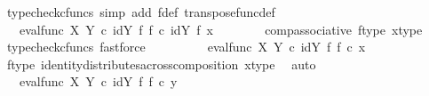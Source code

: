 \begin{isabellebody}
\ {\isacharparenleft}{\kern0pt}typecheck{\isacharunderscore}{\kern0pt}cfuncs{\isacharcomma}{\kern0pt}\ simp\ add{\isacharcolon}{\kern0pt}\ f{\isacharunderscore}{\kern0pt}def\ transpose{\isacharunderscore}{\kern0pt}func{\isacharunderscore}{\kern0pt}def{\isacharparenright}{\kern0pt}\isanewline
\ \ \ \ \isamarkupfalse%
\ \isamarkupfalse%
\ {\isachardoublequoteopen}{\isachardot}{\kern0pt}{\isachardot}{\kern0pt}{\isachardot}{\kern0pt}\ {\isacharequal}{\kern0pt}\ {\isacharparenleft}{\kern0pt}eval{\isacharunderscore}{\kern0pt}func\ X\ Y{\isacharparenright}{\kern0pt}\ {\isasymcirc}\isactrlsub c\ {\isacharparenleft}{\kern0pt}{\isacharparenleft}{\kern0pt}id{\isacharparenleft}{\kern0pt}Y{\isacharparenright}{\kern0pt}\ {\isasymtimes}\isactrlsub f\ f{\isacharparenright}{\kern0pt}\ {\isasymcirc}\isactrlsub c\ {\isacharparenleft}{\kern0pt}id{\isacharparenleft}{\kern0pt}Y{\isacharparenright}{\kern0pt}\ {\isasymtimes}\isactrlsub f\ x{\isacharparenright}{\kern0pt}{\isacharparenright}{\kern0pt}{\isachardoublequoteclose}\isanewline
\ \ \ \ \ \ \isamarkupfalse%
\ comp{\isacharunderscore}{\kern0pt}associative{}\ f{\isacharunderscore}{\kern0pt}type\ x{\isacharunderscore}{\kern0pt}type{}\ \isamarkupfalse%
\ {\isacharparenleft}{\kern0pt}typecheck{\isacharunderscore}{\kern0pt}cfuncs{\isacharcomma}{\kern0pt}\ fastforce{\isacharparenright}{\kern0pt}\isanewline
\ \ \ \ \isamarkupfalse%
\ \isamarkupfalse%
\ {\isachardoublequoteopen}{\isachardot}{\kern0pt}{\isachardot}{\kern0pt}{\isachardot}{\kern0pt}\ {\isacharequal}{\kern0pt}\ {\isacharparenleft}{\kern0pt}eval{\isacharunderscore}{\kern0pt}func\ X\ Y{\isacharparenright}{\kern0pt}\ {\isasymcirc}\isactrlsub c\ {\isacharparenleft}{\kern0pt}id{\isacharparenleft}{\kern0pt}Y{\isacharparenright}{\kern0pt}\ {\isasymtimes}\isactrlsub f\ {\isacharparenleft}{\kern0pt}f\ {\isasymcirc}\isactrlsub c\ x{\isacharparenright}{\kern0pt}{\isacharparenright}{\kern0pt}{\isachardoublequoteclose}\isanewline
\ \ \ \ \ \ \isamarkupfalse%
\ f{\isacharunderscore}{\kern0pt}type\ identity{\isacharunderscore}{\kern0pt}distributes{\isacharunderscore}{\kern0pt}across{\isacharunderscore}{\kern0pt}composition\ x{\isacharunderscore}{\kern0pt}type{}\ \isamarkupfalse%
\ auto\isanewline
\ \ \ \ \isamarkupfalse%
\ \isamarkupfalse%
\ {\isachardoublequoteopen}{\isachardot}{\kern0pt}{\isachardot}{\kern0pt}{\isachardot}{\kern0pt}\ {\isacharequal}{\kern0pt}\ {\isacharparenleft}{\kern0pt}eval{\isacharunderscore}{\kern0pt}func\ X\ Y{\isacharparenright}{\kern0pt}\ {\isasymcirc}\isactrlsub c\ {\isacharparenleft}{\kern0pt}id{\isacharparenleft}{\kern0pt}Y{\isacharparenright}{\kern0pt}\ {\isasymtimes}\isactrlsub f\ {\isacharparenleft}{\kern0pt}f\ {\isasymcirc}\isactrlsub c\ y{\isacharparenright}{\kern0pt}{\isacharparenright}{\kern0pt}{\isachardoublequoteclose}\isanewline

\end{isabellebody}
